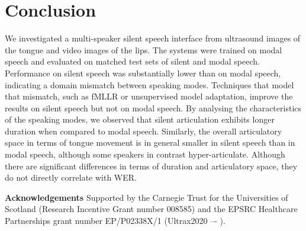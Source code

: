 \documentclass[a4paper]{article}
\begin{document}
\section{Conclusion}

We investigated a multi-speaker silent speech interface from ultrasound images of the tongue and video images of the lips.
The systems were trained on modal speech and evaluated on matched test sets of silent and modal speech.
Performance on silent speech was substantially lower than on modal speech, indicating a domain mismatch between speaking modes.
Techniques that model that mismatch, such as fMLLR or unsupervised model adaptation, improve the results on silent speech but not on modal speech.
By analysing the characteristics of the speaking modes, we observed that silent articulation exhibits longer duration when compared to modal speech.
Similarly, the overall articulatory space in terms of tongue movement is in general smaller in silent speech than in modal speech, although some speakers in contrast hyper-articulate.
Although there are significant differences in terms of duration and articulatory space, they do not directly correlate with WER.


\medskip
\textbf{Acknowledgements}
Supported by the Carnegie Trust for the Universities of Scotland (Research Incentive Grant number 008585)
and the EPSRC Healthcare Partnerships grant number EP/P02338X/1 (Ultrax2020 –- \ultraxurl).



\end{document}
